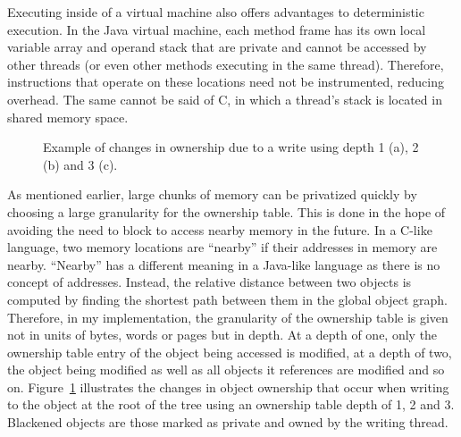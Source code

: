 Executing inside of a virtual machine also offers advantages to
deterministic execution.  In the Java virtual machine, each method
frame has its own local variable array and operand stack that are
private and cannot be accessed by other threads (or even other methods
executing in the same thread).  Therefore, instructions that operate
on these locations need not be instrumented, reducing overhead.  The
same cannot be said of C, in which a thread's stack is located in
shared memory space.

\begin{figure}[!]
  \begin{center}
    {}
  \end{center}
  \caption{Example of changes in ownership due to a write using depth 1 (a), 2
    (b) and 3 (c).}
  \label{fig:depth}
\end{figure}

As mentioned earlier, large chunks of memory can be privatized quickly
by choosing a large granularity for the ownership table.  This is done
in the hope of avoiding the need to block to access nearby memory in
the future.  In a C-like language, two memory locations are ``nearby''
if their addresses in memory are nearby.  ``Nearby'' has a different
meaning in a Java-like language as there is no concept of addresses.
Instead, the relative distance between two objects is computed by
finding the shortest path between them in the global object graph.
Therefore, in my implementation, the granularity of the ownership
table is given not in units of bytes, words or pages but in depth.  At
a depth of one, only the ownership table entry of the object being
accessed is modified, at a depth of two, the object being modified as
well as all objects it references are modified and so on.
Figure~\ref{fig:depth} illustrates the changes in object ownership
that occur when writing to the object at the root of the tree using an
ownership table depth of 1, 2 and 3.  Blackened objects are those
marked as private and owned by the writing thread.

